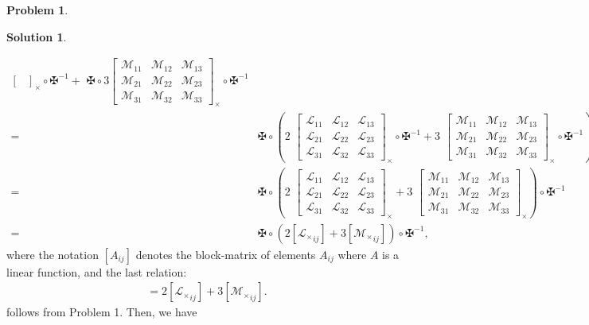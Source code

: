 \documentclass{book}
\theoremstyle{definition}
\newtheorem*{prob*}{Problem}
\newtheorem*{sln*}{Solution}
\newcommand{\lag}{\mathcal{L}}
\newcommand{\M}{\mathcal{M}}
\begin{document}
\begin{prob*}
\begin{sln*}
\begin{enumerate}
\begin{enumerate}
\begin{align*}
\begin{bmatrix}
				\end{bmatrix}_\times \circ \maltese^{-1}
				+ 
				\,\,\maltese\circ 3\begin{bmatrix}
				\M_{11} & \M_{12} & \M_{13}\\
				\M_{21} & \M_{22} & \M_{23}\\
				\M_{31} & \M_{32} & \M_{33}
				\end{bmatrix}_\times \circ \maltese^{-1} \\
				=\,\,
				&\maltese \circ \left(
				2\,\, \begin{bmatrix}
				\lag_{11} & \lag_{12} & \lag_{13}\\
				\lag_{21} & \lag_{22} & \lag_{23}\\
				\lag_{31} & \lag_{32} & \lag_{33}
				\end{bmatrix}_\times \circ \maltese^{-1}
				+
				3\,\, \begin{bmatrix}
				\M_{11} & \M_{12} & \M_{13}\\
				\M_{21} & \M_{22} & \M_{23}\\
				\M_{31} & \M_{32} & \M_{33}
				\end{bmatrix}_\times \circ \maltese^{-1}
				\right)\\
				=\,\,
				&\maltese \circ \left(
				2\,\, \begin{bmatrix}
				\lag_{11} & \lag_{12} & \lag_{13}\\
				\lag_{21} & \lag_{22} & \lag_{23}\\
				\lag_{31} & \lag_{32} & \lag_{33}
				\end{bmatrix}_\times
				+
				3\,\, \begin{bmatrix}
				\M_{11} & \M_{12} & \M_{13}\\
				\M_{21} & \M_{22} & \M_{23}\\
				\M_{31} & \M_{32} & \M_{33}
				\end{bmatrix}_\times
				\right) \circ \maltese^{-1}\\
				=\,\, &\maltese\circ \left( 2[{\lag_\times}_{ij} ] + 3[{\M_\times}_{ij} ]  \right) \circ \maltese^{-1},
				\end{align*}
				where the notation $[A_{ij}]$ denotes the block-matrix of elements $A_{ij}$ where $A$ is a linear function, and the last relation:
				\begin{align*}
				[(2\lag_\times + 3\M_\times)_{ij}] = 2[{\lag_\times}_{ij}] + 3[{\M_\times}_{ij}].
				\end{align*}
				follows from Problem 1. Then, we have
				\begin{align*}

\end{align*}
\end{enumerate}
\end{enumerate}
\end{sln*}
\end{prob*}
\end{document}
